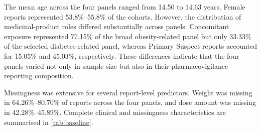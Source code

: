 \documentclass[10pt]{article}
\begin{document}
The mean age across the four panels ranged from 14.50 to 14.63 years. Female reports represented 53.8\%--55.8\% of the cohorts. However, the distribution of medicinal-product roles differed substantially across panels. Concomitant exposure represented 77.15\% of the broad obesity-related panel but only 33.33\% of the selected diabetes-related panel, whereas Primary Suspect reports accounted for 15.05\% and 45.03\%, respectively. These differences indicate that the four panels varied not only in sample size but also in their pharmacovigilance reporting composition.

Missingness was extensive for several report-level predictors. Weight was missing in 64.26\%--80.70\% of reports across the four panels, and dose amount was missing in 42.28\%--45.89\%. Complete clinical and missingness characteristics are summarised in \cref{tab:baseline}.
\end{document}
